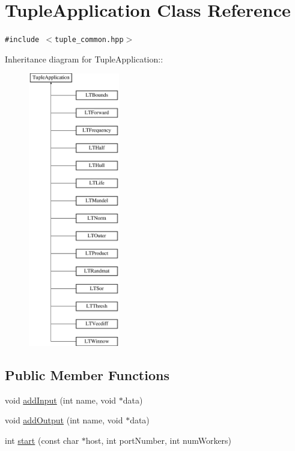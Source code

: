 \hypertarget{class_tuple_application}{
\section{TupleApplication Class Reference}
\label{class_tuple_application}
}
{\tt \#include $<$tuple\_\-common.hpp$>$}

Inheritance diagram for TupleApplication::\begin{figure}[H]
\begin{center}
\leavevmode
\includegraphics[height=12cm]{class_tuple_application}
\end{center}
\end{figure}
\subsection*{Public Member Functions}
\begin{CompactItemize}
\item 
void \hyperlink{class_tuple_application_892dbd783a1983228ac3865fb082f47a}{addInput} (int name, void $\ast$data)
\item 
void \hyperlink{class_tuple_application_985c26b37c8040ea51968af9caca9d3b}{addOutput} (int name, void $\ast$data)
\item 
int \hyperlink{class_tuple_application_9d0c51c481ef477787ffc2fd00116f4e}{start} (const char $\ast$host, int portNumber, int numWorkers)
\end{CompactItemize}
